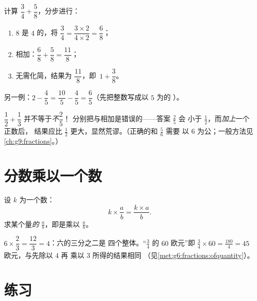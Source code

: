 \begin{example}\label{ex:g7:fractions:add}
计算 $\dfrac{3}{4} + \dfrac{5}{8}$，分步进行：
\begin{enumerate}
  \item $8$ 是 $4$ 的，将
        $\dfrac34 = \dfrac{3 \times 2}{4 \times 2} = \dfrac{6}{8}$；
  \item 相加：$\dfrac{6}{8} + \dfrac{5}{8} = \dfrac{11}{8}$；
  \item 无需化简，结果为 $\dfrac{11}{8}$，即\
        $1 + \dfrac38$。
\end{enumerate}
另一例：$2 - \dfrac{4}{5} = \dfrac{10}{5} - \dfrac{4}{5} =
\dfrac{6}{5}$（先把整数写成以 $5$ 为的
）。
\end{example}

\begin{example}[经典陷阱]\label{ex:g7:fractions:trap}
$\dfrac12 + \dfrac13$ 并不等于\emph{不}$\dfrac{2}{5}$！
分别把与相加是错误的——答案 $\frac25$ 会
小于 $\frac12$，而\emph{加上}一个正数后，
结果应比 $\frac12$ 更大，显然荒谬。（正确的和 $\frac56$ 需要
以 $6$ 为公；一般方法见\cref{ch:g9:fractions}。）
\end{example}

\section{分数乘以一个数}

\begin{proposition}[分数乘以一个数]\label{prop:g7:fractions:mult}
设 $k$ 为一个数：
\[
k \times \frac{a}{b} = \frac{k \times a}{b} .
\]
求某个量\emph{的} $\frac ab$，即是乘以
$\frac ab$。
\end{proposition}
\admitted

\begin{example}\label{ex:g7:fractions:mult}
$6 \times \dfrac{2}{3} = \dfrac{12}{3} = 4$：六的三分之二是
四个整体。“$\frac34$ 的 $60$ 欧元”即
$\frac34 \times 60 = \frac{180}{4} = 45$ 欧元，与先除以 $4$ 再
乘以 $3$ 所得的结果相同
（见\cref{met:g6:fractions:ofquantity}）。
\end{example}

\section{练习}

